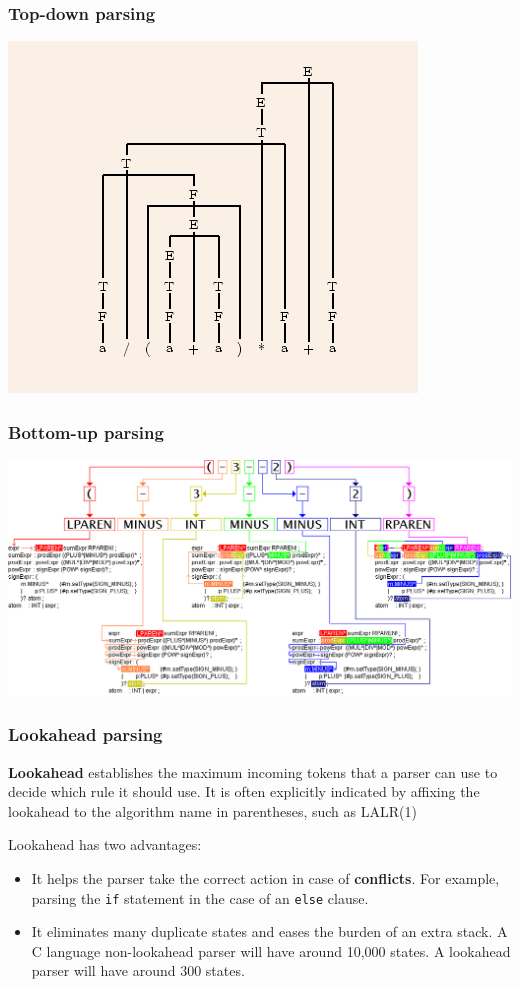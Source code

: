 \documentclass{beamer}
\begin{document}
\begin{frame}
  \frametitle{Top-down parsing}
  \begin{center}
    \includegraphics[scale=0.3]{topdown2}
  \end{center}
\end{frame}

\begin{frame}
  \frametitle{Bottom-up parsing}
  \begin{center}
    \includegraphics[scale=0.3]{sillyastthing}
  \end{center}
\end{frame}

\begin{frame}
  \frametitle{Lookahead parsing}
  \textbf{Lookahead} establishes the maximum incoming tokens that a parser can
  use to decide which rule it should use.  It is often explicitly indicated by
  affixing the lookahead to the algorithm name in parentheses, such as LALR(1)

  \vfill

Lookahead has two advantages:
\begin{itemize}
  \item It helps the parser take the correct action in case of
    \textbf{conflicts}. For example, parsing the \texttt{if} statement in the
    case of an \texttt{else} clause.

  \item It eliminates many duplicate states and eases the burden of an extra
    stack. A C language non-lookahead parser will have around 10,000 states. A
    lookahead parser will have around 300 states.
\end{itemize}
\end{frame}
\end{document}
